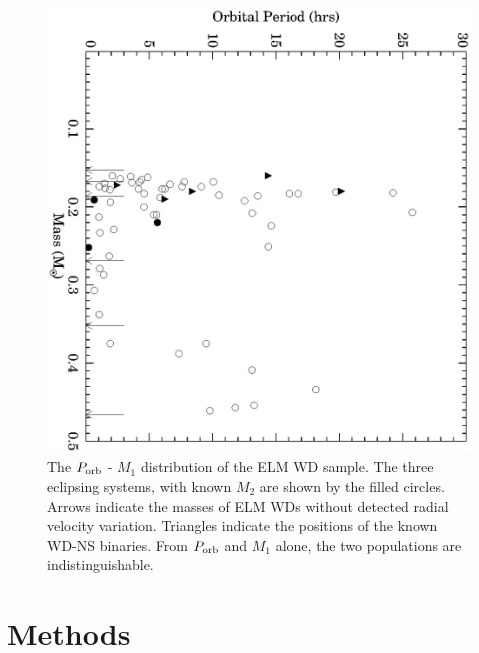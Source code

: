 \documentclass[letterpaper,12pt,preprint]{aastex}
\begin{document}
\begin{figure}[h!]
\begin{center}
\includegraphics[angle=90,width=0.7\columnwidth]{Porb_M1.eps}
\caption{The $P_{\rm orb}$ - $M_1$ distribution of the ELM WD sample. The three eclipsing systems, with known $M_2$ are shown by the filled circles. Arrows indicate the masses of ELM WDs without detected radial velocity variation. Triangles indicate the positions of the known WD-NS binaries. From $P_{\rm orb}$ and $M_1$ alone, the two populations are indistinguishable.}
\end{center}
\end{figure}

\section{Methods}
\end{document}
